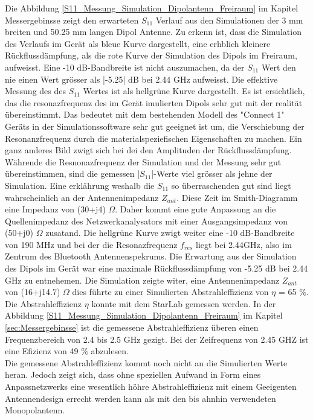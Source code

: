 Die Abbildung \ref{S11_Messung_Simulation_Dipolantenn_Freiraum} im Kapitel Messergebinsse zeigt den erwarteten $S_{11}$ Verlauf aus den Simulationen der 3 mm breiten und 50.25 mm langen Dipol Antenne.  Zu erkenn ist, dass die Simulation des Verlaufs im Gerät als bleue Kurve dargestellt, eine erhblich kleinere Rückflussdämpfung, als die rote Kurve der Simulation des Dipols im Freiraum, aufweisst. Eine -10 dB-Bandbreite ist nicht auszumachen, da der $S_{11}$ Wert den nie einen Wert grösser als |-5.25| dB bei 2.44 GHz aufweisst. Die effektive Messung des des $S_{11}$ Wertes ist als hellgrüne Kurve dargestellt. Es ist ersichtlich, das die resonazfrequenz des im Gerät imulierten Dipols sehr gut mit der realität übereinstimmt. Das bedeutet mit dem bestehenden Modell des "Connect 1" Geräts in der Simulationssoftware sehr gut geeignet ist um, die Verschiebung der Resonanzfrequenz durch die materialspeziefischen Eigenschaften zu machen. Ein ganz anderes Bild zwigt sich bei dei den Amplituden der Rückflussdämpfung. Währende die Resnonazfrequenz der Simulation und der Messung sehr gut übereinstimmen, sind die gemessen |$S_{11}$|-Werte viel grösser als jehne der Simulation. Eine erklährung weshalb die $S_{11}$ so überraschenden gut sind liegt wahrscheinlich an der Antennenimpedanz $Z_{ant}$. Diese Zeit im Smith-Diagramm eine Impedanz von (30+j4) $\Omega$. Daher kommt eine gute Anpassung an die Quellenimpedanz des Netzwerkanalysators mit einer Ausgangsimpedanz von (50+j0) $\Omega$ zusatand. Die hellgrüne Kurve zwigt weiter eine -10 dB-Bandbreite von 190 MHz und bei der die Resonazfrequenz $f_{res}$ liegt bei 2.44GHz, also im Zentrum des Bluetooth Antennenspekrums. Die Erwartung aus der Simulation des Dipols im Gerät war eine maximale Rückflussdämpfung von -5.25 dB bei 2.44 GHz zu entnehemen. Die Simulation zeigte witer, eine Antennenimpedanz $Z_{ant}$ von (16+j14.7) $\Omega$ dies führte zu einer Simulierten Abstrahleffizienz von $\eta$ = 65 $\%$.\\
Die Abstrahleffizienz $\eta$ konnte mit dem StarLab gemessen werden. In der Abbildung \ref{S11_Messung_Simulation_Dipolantenn_Freiraum} im Kapitel \ref{sec:Messergebinsse}  ist die gemessene Abstrahleffizienz überen einen Frequenzbereich von 2.4 bis 2.5 GHz gezigt. Bei der Zeifrequenz von 2.45 GHZ ist eine Efizienz von 49 $\%$ abzulesen.\\
Die gemessene Abstrahleffizienz kommt noch nicht an die Simulierten Werte heran. Jedoch zeigt sich, dass ohne speziellen Aufwand in Form eines Anpassnetzwerks eine wesentlich höhre Abstrahleffizienz mit einem Geeigenten Antennendesign errecht werden kann als mit den bis ahnhin verwendeten Monopolantenn.


